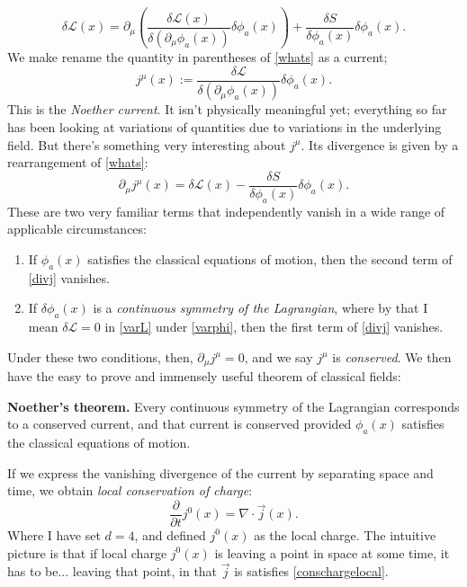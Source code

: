 \documentclass[main.tex]{subfiles}
\begin{document}
\begin{equation} \label{whats}
\delta \mathcal{L} (x) = \partial_\mu \left(
\frac{\delta \mathcal{L} (x)}{\delta (\partial_\mu \phi_a (x))} \delta \phi_a (x)
\right) + \frac{\delta S}{\delta \phi_a (x)} \delta \phi_a (x).
\end{equation}
We make rename the quantity in parentheses of \ref{whats} as a current;
\begin{equation} \label{noethercurrent}
j^\mu (x) := \frac{\delta \mathcal{L}}{\delta (\partial_\mu \phi_a (x))} \delta \phi_a (x).
\end{equation}
This is the \textit{Noether current}. It isn't physically meaningful yet; everything so far has been looking at variations of quantities due to variations in the underlying field. But there's something very interesting about $j^\mu$. Its divergence is given by a rearrangement of \ref{whats}:
\begin{equation} \label{divj}
\partial_\mu j^\mu (x) = \delta \mathcal{L} (x) - \frac{\delta S}{\delta\phi_a (x)} \delta \phi_a (x).
\end{equation}
These are two very familiar terms that independently vanish in a wide range of applicable circumstances:
\begin{enumerate} [(1)]
\item If $\phi_a (x)$ satisfies the classical equations of motion, then the second term of \ref{divj} vanishes. 

\item If $\delta \phi_a (x)$ is a \textit{continuous symmetry of the Lagrangian}, where by that I mean $\delta \mathcal{L}=0$ in \ref{varL} under \ref{varphi}, then the first term of \ref{divj} vanishes.
\end{enumerate}
Under these two conditions, then, $\partial_\mu j^\mu = 0$, and we say $j^\mu$ is \textit{conserved}. We then have the easy to prove and immensely useful theorem of classical fields:

\begin{thm} \label{thm:noether} \textbf{Noether's theorem.}
Every continuous symmetry of the Lagrangian corresponds to a conserved current, and that current is conserved provided $\phi_a (x)$ satisfies the classical equations of motion.
\end{thm}

If we express the vanishing divergence of the current by separating space and time, we obtain \textit{local conservation of charge}:
\begin{equation} \label{conschargelocal}
\frac{\partial}{\partial t} j^0 (x) = \nabla \cdot \vec{j} (x).
\end{equation}
Where I have set $d = 4$, and defined $j^0 (x)$ as the local charge. The intuitive picture is that if local charge $j^0 (x)$ is leaving a point in space at some time, it has to be... leaving that point, in that $\vec{j}$ is satisfies \ref{conschargelocal}. 
\end{document}
